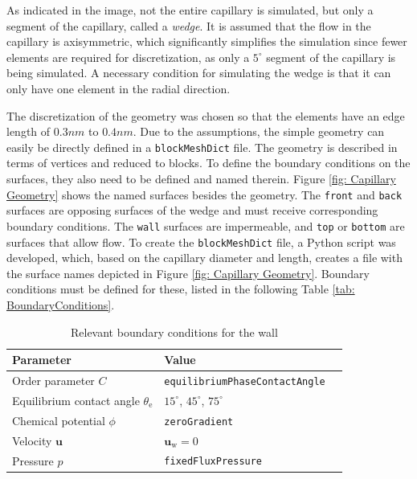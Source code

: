 As indicated in the image, not the entire capillary is simulated, but only a segment of the capillary, called a \textit{wedge}. It is assumed that the flow in the capillary is axisymmetric, which significantly simplifies the simulation since fewer elements are required for discretization, as only a $5^{\circ}$ segment of the capillary is being simulated. A necessary condition for simulating the wedge is that it can only have one element in the radial direction.

The discretization of the geometry was chosen so that the elements have an edge length of $0.3nm$ to $0.4nm$. Due to the assumptions, the simple geometry can easily be directly defined in a \texttt{blockMeshDict} file. The geometry is described in terms of vertices and reduced to blocks. To define the boundary conditions on the surfaces, they also need to be defined and named therein. Figure \ref{fig: Capillary Geometry} shows the named surfaces besides the geometry. The \texttt{front} and \texttt{back} surfaces are opposing surfaces of the wedge and must receive corresponding boundary conditions. The \texttt{wall} surfaces are impermeable, and \texttt{top} or \texttt{bottom} are surfaces that allow flow. To create the \texttt{blockMeshDict} file, a Python script was developed, which, based on the capillary diameter and length, creates a file with the surface names depicted in Figure \ref{fig: Capillary Geometry}. Boundary conditions must be defined for these, listed in the following Table \ref{tab: BoundaryConditions}.

\begin{table}[h]
    \centering
        \caption{Relevant boundary conditions for the wall}
        \label{tab: BoundaryConditions_wall}
        \begin{tabular}{lll}
            Parameter & Value \\ \hline
            Order parameter $C$ & \texttt{equilibriumPhaseContactAngle}     \\
            Equilibrium contact angle $\theta_{\mathrm{e}}$ & $15^{\circ}$, $45^{\circ}$, $75^{\circ}$\\
            Chemical potential $\phi$   & \texttt{zeroGradient}        \\ 
            Velocity $\mathbf{u}$ &   $\mathbf{u_{\mathrm{w}}} = 0$\\
            Pressure $p$&  \texttt{fixedFluxPressure} \\
        \end{tabular}
\end{table}


